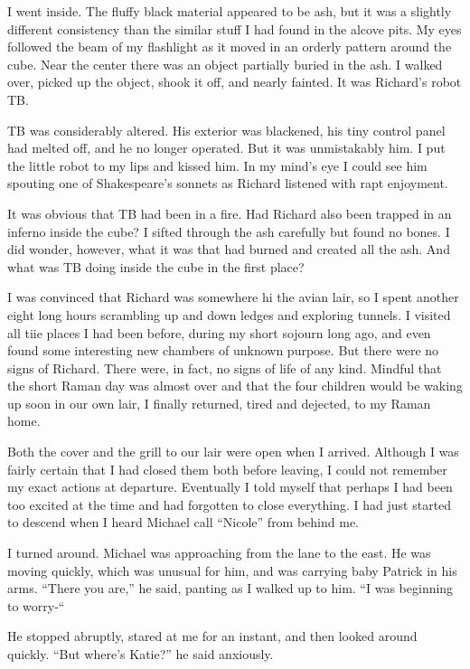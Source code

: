 \documentclass[]{article}
\begin{document}
I went inside.  The fluffy black material appeared to be ash, but it was a slightly different consistency than the similar stuff I had found in the alcove pits.  My eyes followed the beam of my flashlight as it moved in an orderly pattern around the cube.  Near the center there was an object partially buried in the ash.  I walked over, picked up the object, shook it off, and nearly fainted.  It was Richard’s robot TB.

TB was considerably altered.  His exterior was blackened, his tiny control panel had melted off, and he no longer operated.  But it was unmistakably him.  I put the little robot to my lips and kissed him.  In my mind’s eye I could see him spouting one of Shakespeare’s sonnets as Richard listened with rapt enjoyment.

It was obvious that TB had been in a fire.  Had Richard also been trapped in an inferno inside the cube? I sifted through the ash carefully but found no bones.  I did wonder, however, what it was that had burned and created all the ash.  And what was TB doing inside the cube in the first place?

I was convinced that Richard was somewhere hi the avian lair, so I spent another eight long hours scrambling up and down ledges and exploring tunnels.  I visited all tiie places I had been before, during my short sojourn long ago, and even found some interesting new chambers of unknown purpose.  But there were no signs of Richard.  There were, in fact, no signs of life of any kind.  Mindful that the short Raman day was almost over and that the four children would be waking up soon in our own lair, I finally returned, tired and dejected, to my Raman home.

Both the cover and the grill to our lair were open when I arrived.  Although I was fairly certain that I had closed them both before leaving, I could not remember my exact actions at departure.  Eventually I told myself that perhaps I had been too excited at the time and had forgotten to close everything.  I had just started to descend when I heard Michael call “Nicole” from behind me.

I turned around.  Michael was approaching from the lane to the east.  He was moving quickly, which was unusual for him, and was carrying baby Patrick in his arms.  “There you are,” he said, panting as I walked up to him.  “I was beginning to worry-“

He stopped abruptly, stared at me for an instant, and then looked around quickly.  “But where’s Katie?” he said anxiously.
\end{document}
